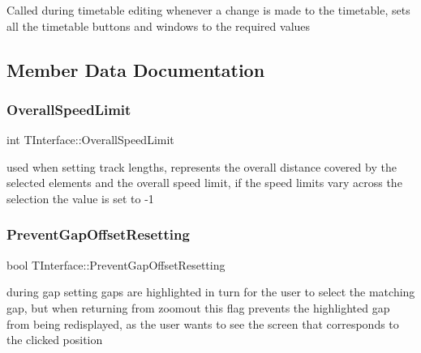 Called during timetable editing whenever a change is made to the timetable, sets all the timetable buttons and windows to the required values 

\subsection{Member Data Documentation}
\mbox{\label{class_t_interface_acc810716df0d41cad86bcba2027ff93e}} 
\subsubsection{\texorpdfstring{Overall\+Speed\+Limit}{OverallSpeedLimit}}
{\footnotesize\ttfamily int T\+Interface\+::\+Overall\+Speed\+Limit\hspace{0.3cm}{\ttfamily [private]}}

used when setting track lengths, represents the overall distance covered by the selected elements and the overall speed limit, if the speed limits vary across the selection the value is set to -\/1 \mbox{\label{class_t_interface_ae6c305a014fd20195a90258578a7bcee}} 
\subsubsection{\texorpdfstring{Prevent\+Gap\+Offset\+Resetting}{PreventGapOffsetResetting}}
{\footnotesize\ttfamily bool T\+Interface\+::\+Prevent\+Gap\+Offset\+Resetting\hspace{0.3cm}{\ttfamily [private]}}

during gap setting gaps are highlighted in turn for the user to select the matching gap, but when returning from zoomout this flag prevents the highlighted gap from being redisplayed, as the user wants to see the screen that corresponds to the clicked position \mbox{\label{class_t_interface_ae217ab17f77c5f5e6008cdd7d5059e5a}} 
